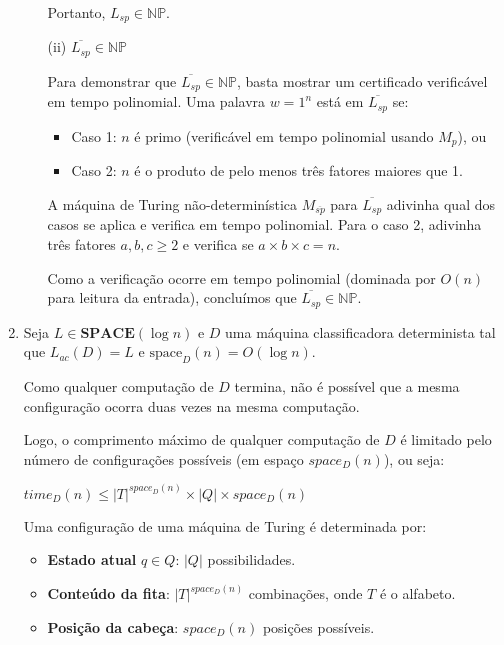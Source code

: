\documentclass[a4paper,12pt]{article}
\begin{document}
\begin{enumerate}[label=\alph*)]
\begin{enumerate}
      \vspace{0.2cm}
      Portanto, $L_{sp} \in \mathbb{NP}$.
      
      \vspace{0.5cm}
      \item[(ii)] \( \overline{L_{sp}} \in \mathbb{NP} \)
      
      Para demonstrar que $\overline{L_{sp}} \in \mathbb{NP}$, basta mostrar um certificado verificável em tempo polinomial. Uma palavra $w = 1^n$ está em $\overline{L_{sp}}$ se:
      \begin{itemize}
          \item Caso 1: $n$ é primo (verificável em tempo polinomial usando $M_p$), ou
          \item Caso 2: $n$ é o produto de pelo menos três fatores maiores que 1.
      \end{itemize}
      
      A máquina de Turing não-determinística $M_{\overline{sp}}$ para $\overline{L_{sp}}$ adivinha qual dos casos se aplica e verifica em tempo polinomial. Para o caso 2, adivinha três fatores $a, b, c \geq 2$ e verifica se $a \times b \times c = n$.
      
      Como a verificação ocorre em tempo polinomial (dominada por $O(n)$ para leitura da entrada), concluímos que $\overline{L_{sp}} \in \mathbb{NP}$.
  \end{enumerate}

  \vspace{0.5cm}
  \item 
  Seja $L \in \textbf{SPACE}(\log n)$ e $D$ uma máquina classificadora determinista tal que $L_{ac}(D) = L$ e $\text{space}_D(n) = O(\log n)$.

  \vspace{0.3cm}
  Como qualquer computação de $D$ termina, não é possível que a mesma configuração ocorra duas vezes na mesma computação.

  \vspace{0.3cm}
  Logo, o comprimento máximo de qualquer computação de $D$ é limitado pelo número de configurações possíveis (em espaço $space_D(n)$), ou seja:
  \begin{center}
      $time_D(n) \leq |T|^{space_D(n)} \times |Q| \times space_D(n)$
  \end{center}
  Uma configuração de uma máquina de Turing é determinada por:

  \begin{itemize}
      \item \textbf{Estado atual} $ q \in Q $: $ |Q| $ possibilidades.
      \item \textbf{Conteúdo da fita}: $ |T|^{space_D(n)} $ combinações, onde $ T $ é o alfabeto.
      \item \textbf{Posição da cabeça}: $ space_D(n) $ posições possíveis.
  \end{itemize}


\end{enumerate}
\end{document}
